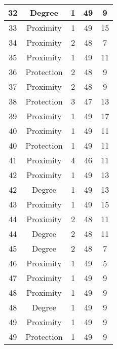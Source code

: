\documentclass[results.tex]{subfiles}
\begin{document}
\begin{center}
\begin{tabular}{| c || c | c | c | c |}
    32 & Degree & 1 & 49 & 9 \\ 
    \hline
    33 & Proximity & 1 & 49 & 15 \\ 
    \hline
    34 & Proximity & 2 & 48 & 7 \\ 
    \hline
    35 & Proximity & 1 & 49 & 11 \\ 
    \hline
    36 & Protection & 2 & 48 & 9 \\ 
    \hline
    37 & Proximity & 2 & 48 & 9 \\ 
    \hline
    38 & Protection & 3 & 47 & 13 \\ 
    \hline
    39 & Proximity & 1 & 49 & 17 \\ 
    \hline
    40 & Proximity & 1 & 49 & 11 \\ 
    \hline
    40 & Protection & 1 & 49 & 11 \\ 
    \hline
    41 & Proximity & 4 & 46 & 11 \\ 
    \hline
    42 & Proximity & 1 & 49 & 13 \\ 
    \hline
    42 & Degree & 1 & 49 & 13 \\ 
    \hline
    43 & Proximity & 1 & 49 & 15 \\ 
    \hline
    44 & Proximity & 2 & 48 & 11 \\ 
    \hline
    44 & Degree & 2 & 48 & 11 \\ 
    \hline
    45 & Degree & 2 & 48 & 7 \\ 
    \hline
    46 & Proximity & 1 & 49 & 5 \\ 
    \hline
    47 & Proximity & 1 & 49 & 9 \\ 
    \hline
    48 & Proximity & 1 & 49 & 9 \\ 
    \hline
    48 & Degree & 1 & 49 & 9 \\ 
    \hline
    49 & Proximity & 1 & 49 & 9 \\ 
    \hline
    49 & Protection & 1 & 49 & 9 \\ 
    \hline   \end{tabular}
\end{center}
\end{document}
